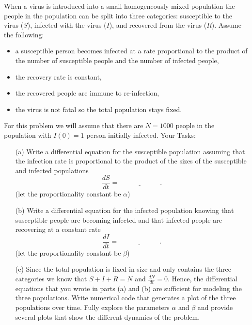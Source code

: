 \begin{problem}
    When a virus is introduced into a small homogeneously mixed population the people in
    the population can be split into three categories: susceptible to the virus ($S$),
    infected with the virus ($I$), and recovered from the virus ($R$).  Assume the
    following:
    \begin{itemize}
        \item a susceptible person becomes infected at a rate proportional to the product
            of the number of susceptible people and the number of infected people,
        \item the recovery rate is constant,
        \item the recovered people are immune to re-infection,
        \item the virus is not fatal so the total population stays fixed.
    \end{itemize}
    For this problem we will assume that there are $N=1000$ people in the population with
    $I(0) = 1$ person initially infected.
    Your Tasks:
    \begin{enumerate}
        \item[(a)] Write a differential equation for the susceptible population assuming
            that the infection rate is proportional to the product of the sizes of the
            susceptible and infected populations
            \[ \frac{dS}{dt} = \underline{\hspace{1in}}. \]
            (let the proportionality constant be $\alpha$)
        \item[(b)] Write a differential equation for the infected population knowing that
            susceptible people are becoming infected and that infected people are
            recovering at a constant rate
            \[ \frac{dI}{dt} = \underline{\hspace{1in}}. \]
            (let the proportionality constant be $\beta$)
        \item[(c)] Since the total population is fixed in size and only contains the three
            categories we know that $S+I+R = N$ and $\frac{dN}{dt} = 0$.  Hence, the
            differential equations that you wrote in parts (a) and (b) are sufficient for
            modeling the three populations.  Write numerical code that generates a plot of
            the three populations over time.  Fully explore the parameters $\alpha$ and
            $\beta$ and provide several plots that show the different dynamics of the
            problem.
    \end{enumerate}
\end{problem}


